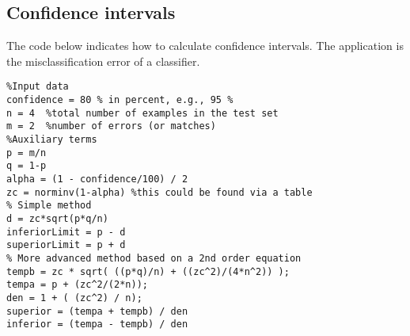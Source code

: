 \subsection{Confidence intervals}
%
The code below indicates how to calculate confidence intervals. The application is the misclassification error of a classifier.
%
\begin{lstlisting}
%Input data
confidence = 80 % in percent, e.g., 95 %
n = 4  %total number of examples in the test set
m = 2  %number of errors (or matches)
%Auxiliary terms
p = m/n
q = 1-p
alpha = (1 - confidence/100) / 2
zc = norminv(1-alpha) %this could be found via a table
% Simple method
d = zc*sqrt(p*q/n)
inferiorLimit = p - d
superiorLimit = p + d
% More advanced method based on a 2nd order equation 
tempb = zc * sqrt( ((p*q)/n) + ((zc^2)/(4*n^2)) );
tempa = p + (zc^2/(2*n));
den = 1 + ( (zc^2) / n);
superior = (tempa + tempb) / den
inferior = (tempa - tempb) / den
\end{lstlisting}
